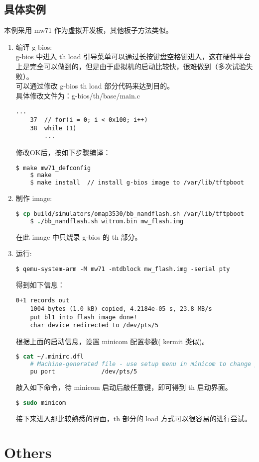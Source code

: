 \subsection{具体实例}
本例采用 mw71 作为虚拟开发板，其他板子方法类似。
\begin{enumerate}
	\item 编译 g-bios: \\
	g-bios 中进入 th load 引导菜单可以通过长按键盘空格键进入，这在硬件平台上是完全可以做到的，但是由于虚拟机的启动比较快，很难做到（多次试验失败）。\\
	可以通过修改 g-bios th load 部分代码来达到目的。\\
	具体修改文件为：g-bios/th/base/main.c
	\lstset{language=[ANSI]C}
	\begin{lstlisting}[numbers=none]
		...
	37	// for(i = 0; i < 0x100; i++)
	38	while (1)
		...
	\end{lstlisting}
	修改OK后，按如下步骤编译：
	\begin{lstlisting}[language=sh,numbers=none]
	$ make mw71_defconfig
	$ make
	$ make install  // install g-bios image to /var/lib/tftpboot
	\end{lstlisting}

	\item 制作 image:
	\begin{lstlisting}[language=csh,numbers=none]
	$ cp build/simulators/omap3530/bb_nandflash.sh /var/lib/tftpboot
	$ ./bb_nandflash.sh witrom.bin mw_flash.img
	\end{lstlisting}
	在此 image 中只烧录 g-bios 的 th 部分。

	\item 运行:
	\begin{lstlisting}[language=csh,numbers=none]
	$ qemu-system-arm -M mw71 -mtdblock mw_flash.img -serial pty
	\end{lstlisting}
	得到如下信息：
	\begin{lstlisting}[numbers=none]
	0+1 records out
	1004 bytes (1.0 kB) copied, 4.2184e-05 s, 23.8 MB/s
	put bl1 into flash image done!
	char device redirected to /dev/pts/5
	\end{lstlisting}
	根据上面的启动信息，设置 minicom 配置参数( kermit 类似)。
	\begin{lstlisting}[language=csh,numbers=none]
	$ cat ~/.minirc.dfl
	# Machine-generated file - use setup menu in minicom to change parameters.
	pu port             /dev/pts/5
	\end{lstlisting}
	敲入如下命令，待 minicom 启动后敲任意键，即可得到 th 启动界面。
	\begin{lstlisting}[language=csh,numbers=none]
	$ sudo minicom
	\end{lstlisting}
	接下来进入那比较熟悉的界面，th 部分的 load 方式可以很容易的进行尝试。

\end{enumerate}

\section{Others}
